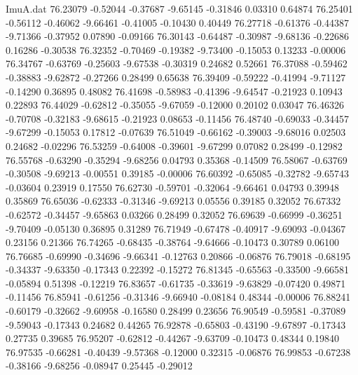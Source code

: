 \begin{filecontents}{ImuA.dat}
  76.23079   -0.52044   -0.37687   -9.65145   -0.31846    0.03310    0.64874
  76.25401   -0.56112   -0.46062   -9.66461   -0.41005   -0.10430    0.40449
  76.27718   -0.61376   -0.44387   -9.71366   -0.37952    0.07890   -0.09166
  76.30143   -0.64487   -0.30987   -9.68136   -0.22686    0.16286   -0.30538
  76.32352   -0.70469   -0.19382   -9.73400   -0.15053    0.13233   -0.00006
  76.34767   -0.63769   -0.25603   -9.67538   -0.30319    0.24682    0.52661
  76.37088   -0.59462   -0.38883   -9.62872   -0.27266    0.28499    0.65638
  76.39409   -0.59222   -0.41994   -9.71127   -0.14290    0.36895    0.48082
  76.41698   -0.58983   -0.41396   -9.64547   -0.21923    0.10943    0.22893
  76.44029   -0.62812   -0.35055   -9.67059   -0.12000    0.20102    0.03047
  76.46326   -0.70708   -0.32183   -9.68615   -0.21923    0.08653   -0.11456
  76.48740   -0.69033   -0.34457   -9.67299   -0.15053    0.17812   -0.07639
  76.51049   -0.66162   -0.39003   -9.68016    0.02503    0.24682   -0.02296
  76.53259   -0.64008   -0.39601   -9.67299    0.07082    0.28499   -0.12982
  76.55768   -0.63290   -0.35294   -9.68256    0.04793    0.35368   -0.14509
  76.58067   -0.63769   -0.30508   -9.69213   -0.00551    0.39185   -0.00006
  76.60392   -0.65085   -0.32782   -9.65743   -0.03604    0.23919    0.17550
  76.62730   -0.59701   -0.32064   -9.66461    0.04793    0.39948    0.35869
  76.65036   -0.62333   -0.31346   -9.69213    0.05556    0.39185    0.32052
  76.67332   -0.62572   -0.34457   -9.65863    0.03266    0.28499    0.32052
  76.69639   -0.66999   -0.36251   -9.70409   -0.05130    0.36895    0.31289
  76.71949   -0.67478   -0.40917   -9.69093   -0.04367    0.23156    0.21366
  76.74265   -0.68435   -0.38764   -9.64666   -0.10473    0.30789    0.06100
  76.76685   -0.69990   -0.34696   -9.66341   -0.12763    0.20866   -0.06876
  76.79018   -0.68195   -0.34337   -9.63350   -0.17343    0.22392   -0.15272
  76.81345   -0.65563   -0.33500   -9.66581   -0.05894    0.51398   -0.12219
  76.83657   -0.61735   -0.33619   -9.63829   -0.07420    0.49871   -0.11456
  76.85941   -0.61256   -0.31346   -9.66940   -0.08184    0.48344   -0.00006
  76.88241   -0.60179   -0.32662   -9.60958   -0.16580    0.28499    0.23656
  76.90549   -0.59581   -0.37089   -9.59043   -0.17343    0.24682    0.44265
  76.92878   -0.65803   -0.43190   -9.67897   -0.17343    0.27735    0.39685
  76.95207   -0.62812   -0.44267   -9.63709   -0.10473    0.48344    0.19840
  76.97535   -0.66281   -0.40439   -9.57368   -0.12000    0.32315   -0.06876
  76.99853   -0.67238   -0.38166   -9.68256   -0.08947    0.25445   -0.29012

\end{filecontents}
